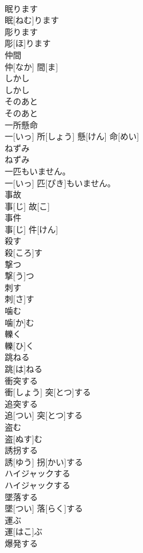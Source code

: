 \documentclass[8pt]{extreport}
\begin{document}
\begin{CJK}{UTF8}{min}
\\	眠ります	
\\	眠[ねむ]ります		
\\	彫ります	
\\	彫[ほ]ります		
\\	仲間	
\\	仲[なか] 間[ま]		
\\	しかし	
\\	しかし		
\\	そのあと	
\\	そのあと		
\\	一所懸命	
\\	一[いっ] 所[しょう] 懸[けん] 命[めい]		
\\	ねずみ	
\\	ねずみ		
\\	一匹もいません。	
\\	一[いっ] 匹[ぴき]もいません。		
\\	事故	
\\	事[じ] 故[こ]		
\\	事件	
\\	事[じ] 件[けん]		
\\	殺す	
\\	殺[ころ]す		
\\	撃つ	
\\	撃[う]つ		
\\	刺す	
\\	刺[さ]す		
\\	噛む	
\\	噛[か]む		
\\	轢く	
\\	轢[ひ]く		
\\	跳ねる	
\\	跳[は]ねる		
\\	衝突する	
\\	衝[しょう] 突[とつ]する		
\\	追突する	
\\	追[つい] 突[とつ]する		
\\	盗む	
\\	盗[ぬす]む		
\\	誘拐する	
\\	誘[ゆう] 拐[かい]する		
\\	ハイジャックする	
\\	ハイジャックする		
\\	墜落する	
\\	墜[つい] 落[らく]する		
\\	運ぶ	
\\	運[はこ]ぶ		
\\	爆発する	

\end{CJK}
\end{document}
